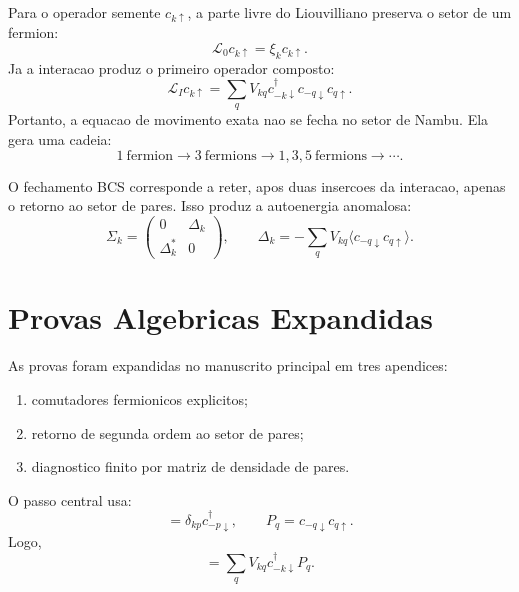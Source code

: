 \documentclass[11pt,a4paper]{article}
\begin{document}
Para o operador semente \(c_{k\uparrow}\), a parte livre do Liouvilliano preserva o setor de um fermion:
\begin{equation}
\mathcal{L}_0 c_{k\uparrow}=\xi_k c_{k\uparrow}.
\end{equation}
Ja a interacao produz o primeiro operador composto:
\begin{equation}
\mathcal{L}_I c_{k\uparrow}
=\sum_q V_{kq}
c^\dagger_{-k\downarrow}c_{-q\downarrow}c_{q\uparrow}.
\end{equation}
Portanto, a equacao de movimento exata nao se fecha no setor de Nambu. Ela gera uma cadeia:
\begin{equation}
1\mathrm{\ fermion}
\rightarrow
3\mathrm{\ fermions}
\rightarrow
1,3,5\mathrm{\ fermions}
\rightarrow\cdots .
\end{equation}

O fechamento BCS corresponde a reter, apos duas insercoes da interacao, apenas o retorno ao setor de pares. Isso produz a autoenergia anomalosa:
\begin{equation}
\Sigma_k=
\begin{pmatrix}
0&\Delta_k\\
\Delta_k^\ast&0
\end{pmatrix},
\qquad
\Delta_k=-\sum_qV_{kq}\langle c_{-q\downarrow}c_{q\uparrow}\rangle .
\end{equation}

\section{Provas Algebricas Expandidas}

As provas foram expandidas no manuscrito principal em tres apendices:

\begin{enumerate}
\item comutadores fermionicos explicitos;
\item retorno de segunda ordem ao setor de pares;
\item diagnostico finito por matriz de densidade de pares.
\end{enumerate}

O passo central usa:
\begin{equation}
[c_{k\uparrow},P_p^\dagger]
=\delta_{kp}c^\dagger_{-p\downarrow},
\qquad
P_q=c_{-q\downarrow}c_{q\uparrow}.
\end{equation}
Logo,
\begin{equation}
[c_{k\uparrow},H_{\mathrm{int}}]
=\sum_qV_{kq}c^\dagger_{-k\downarrow}P_q.
\end{equation}
\end{document}
